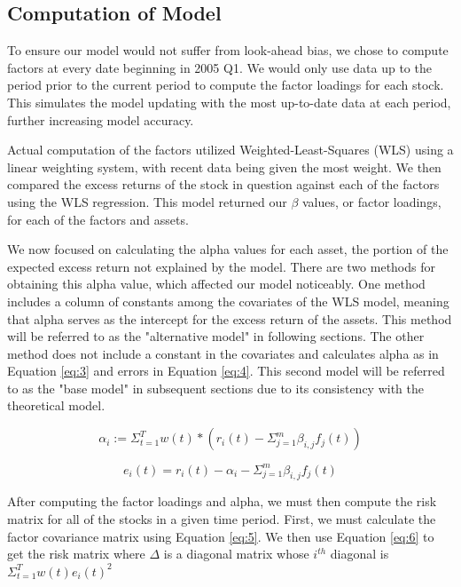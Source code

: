 \documentclass[final]{article}
\begin{document}
\subsection{Computation of Model}
\hspace{\parindent}To ensure our model would not suffer from look-ahead bias, we chose to compute factors at every date beginning in 2005 Q1. We would only use data up to the period prior to the current period to compute the factor loadings for each stock. This simulates the model updating with the most up-to-date data at each period, further increasing model accuracy.

Actual computation of the factors utilized Weighted-Least-Squares (WLS) using a linear weighting system, with recent data being given the most weight. We then compared the excess returns of the stock in question against each of the factors using the WLS regression. This model returned our $\beta$ values, or factor loadings, for each of the factors and assets.

We now focused on calculating the alpha values for each asset, the portion of the expected excess return not explained by the model. There are two methods for obtaining this alpha value, which affected our model noticeably. One method includes a column of constants among the covariates of the WLS model, meaning that alpha serves as the intercept for the excess return of the assets. This method will be referred to as the "alternative model" in following sections. The other method does not include a constant in the covariates and calculates alpha as in Equation \ref{eq:3} and errors in Equation \ref{eq:4}. This second model will be referred to as the "base model" in subsequent sections due to its consistency with the theoretical model.

\begin{equation}
    \label{eq:3}
    \alpha_i := \Sigma_{t=1}^{T}w(t) *(r_{i}(t) - \Sigma_{j=1}^{m}\beta_{i,j}f_{j}(t))
\end{equation}

\begin{equation}
    \label{eq:4}
    e_{i}(t) = r_{i}(t)-\alpha_{i}-\Sigma_{j=1}^{m}\beta_{i,j}f_{j}(t)
\end{equation}

After computing the factor loadings and alpha, we must then compute the risk matrix for all of the stocks in a given time period. First, we must calculate the factor covariance matrix using Equation \ref{eq:5}. We then use Equation \ref{eq:6} to get the risk matrix where $\Delta$ is a diagonal matrix whose $i^{th}$ diagonal is $\Sigma_{t=1}^{T}w(t)e_i(t)^2$
\end{document}
